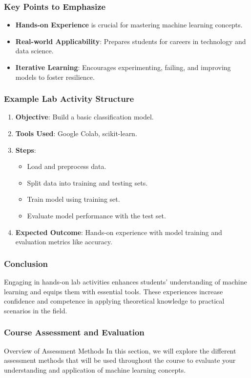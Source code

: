 \documentclass[aspectratio=169]{beamer}
\begin{document}
\begin{frame}[fragile]
    \frametitle{Key Points to Emphasize}
    \begin{itemize}
        \item \textbf{Hands-on Experience} is crucial for mastering machine learning concepts.
        \item \textbf{Real-world Applicability}: Prepares students for careers in technology and data science.
        \item \textbf{Iterative Learning}: Encourages experimenting, failing, and improving models to foster resilience.
    \end{itemize}
\end{frame}

\begin{frame}[fragile]
    \frametitle{Example Lab Activity Structure}
    \begin{enumerate}
        \item \textbf{Objective}: Build a basic classification model.
        \item \textbf{Tools Used}: Google Colab, scikit-learn.
        \item \textbf{Steps}:
        \begin{itemize}
            \item Load and preprocess data.
            \item Split data into training and testing sets.
            \item Train model using training set.
            \item Evaluate model performance with the test set.
        \end{itemize}
        \item \textbf{Expected Outcome}: Hands-on experience with model training and evaluation metrics like accuracy.
    \end{enumerate}
\end{frame}

\begin{frame}[fragile]
    \frametitle{Conclusion}
    Engaging in hands-on lab activities enhances students' understanding of machine learning and equips them with essential tools. These experiences increase confidence and competence in applying theoretical knowledge to practical scenarios in the field.
\end{frame}

\begin{frame}[fragile]
    \frametitle{Course Assessment and Evaluation}
    \begin{block}{Overview of Assessment Methods}
        In this section, we will explore the different assessment methods that will be used throughout the course to evaluate your understanding and application of machine learning concepts.
    \end{block}
\end{frame}
\end{document}
